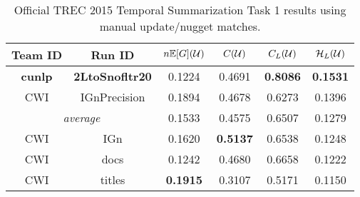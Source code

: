 \begin{table}[t]
\centering
\begin{tabular}{cccccc}
\toprule
Team ID & Run ID &$n\mathbb{E}[G](\mathcal{U})$ & $C(\mathcal{U})$ & $C_L(\mathcal{U})$ & $\mathcal{H}_L(\mathcal{U})$ \\
\midrule
\textbf{cunlp} & \textbf{2LtoSnofltr20} & 0.1224 & 0.4691 & \textbf{0.8086}  & \textbf{0.1531} \\
CWI & IGnPrecision & 0.1894 & 0.4678 & 0.6273 & 0.1396 \\
\midrule
\multicolumn{2}{c}{\textit{average}} & 0.1533 & 0.4575 & 0.6507 & 0.1279 \\
\midrule
CWI &  IGn & 0.1620 & \textbf{0.5137} & 0.6538 &0.1248 \\
CWI & docs & 0.1242 & 0.4680 & 0.6658 &0.1222 \\
CWI & titles & \textbf{0.1915} & 0.3107 & 0.5171 & 0.1150 \\
\bottomrule
\end{tabular}
\caption{Official TREC 2015 Temporal Summarization Task 1 results
using manual update/nugget matches.}
\label{tab:trec15t1}
\end{table}
